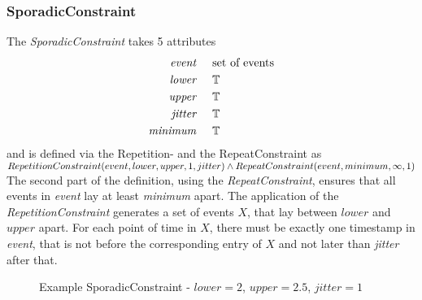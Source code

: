 	\subsubsection{SporadicConstraint}
		The \emph{SporadicConstraint} takes 5 attributes
		\begin{align*}
			\emph{event} 	& \hspace{.5cm}\text{set of events}\\
			\emph{lower} 	& \hspace{.5cm}\mathbb{T}\\
			\emph{upper} 	& \hspace{.5cm}\mathbb{T}\\
			\emph{jitter}	& \hspace{.5cm}\mathbb{T}\\
			\emph{minimum}	& \hspace{.5cm}\mathbb{T}\\
		\end{align*}
		and is defined via the Repetition- and the RepeatConstraint as\\[10pt]
		\begin{math}
			RepetitionConstraint(event, lower, upper, 1, jitter)\\
			\land RepeatConstraint(event, minimum, \infty, 1)
		\end{math}\\[10pt]
		The second part of the definition, using the \emph{RepeatConstraint}, ensures that all events in \emph{event} lay at least \emph{minimum} apart. The application of the \emph{RepetitionConstraint} generates a set of events $X$, that lay between $lower$ and $upper$ apart. For each point of time in $X$, there must be exactly one timestamp in \emph{event}, that is not before the corresponding entry of $X$ and not later than \emph{jitter} after that.
		\begin{figure}
			\caption{Example SporadicConstraint - $lower=2$, $upper=2.5$, $jitter=1$}
			\label{fig:SporadicConstraintExample}
		\end{figure}
